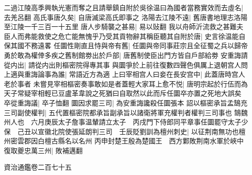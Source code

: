 二過江陵高季興執光憲而奪之且請舉鎮自附於吳徐温曰為國者當務實效而去虛名|{
	去羌呂翻}
高氏事唐久矣|{
	自唐滅梁高氏即事之}
洛陽去江陵不遠|{
	舊唐書地理志洛陽至江陵一千三百一十五里}
唐人步騎襲之甚易|{
	易以䜴翻}
我以舟師沂流救之甚難夫臣人而弗能救使之危亡能無愧乎乃受其貢物辭其稱臣聽其自附於唐|{
	史言徐温能自保其國不務遠畧}
任圜性剛直且恃與帝有舊|{
	任圜與帝同事莊宗且全征蜀之兵以歸帝}
勇於敢為權倖多疾之舊制館劵出於戶部|{
	唐舊制使臣出門方皆自戶部給劵}
安重誨請從内出|{
	請從内出則樞密院得專其事}
與圜爭於上前往復數四聲色俱厲上退朝宫人問上適與重誨論事為誰|{
	常語近方為適}
上曰宰相宫人曰妾在長安宫中|{
	此蓋唐時宫人老於事者}
未嘗見宰相樞密奏事敢如是者蓋輕大家耳上愈不悦|{
	唐明宗起於行伍而為天子常疑宰相輕已豆盧革韋說之死猶曰自取然以此而斥任圜卒亦置之死地大誤矣}
卒從重誨議|{
	卒子恤翻}
圜因求罷三司|{
	為安重誨讒殺任圜張本}
詔以樞密承旨孟鵠充三司副使權判|{
	五代置樞密院都承旨副承旨以諸衛將軍充權判者權判三司事也}
鵠魏州人也　六月庚辰太子詹事温輦請立太子　丙戌門下侍郎同平章事任圜罷守太子少保　己丑以宣徽北院使張延朗判三司　壬辰貶劉訓為檀州刺史|{
	以征荆南無功也檀州密雲郡因白檀古縣名以名州}
丙申封楚王殷為楚國王　西方鄴敗荆南水軍於峽中復取夔忠萬三州|{
	敗補邁翻}


資治通鑑卷二百七十五
